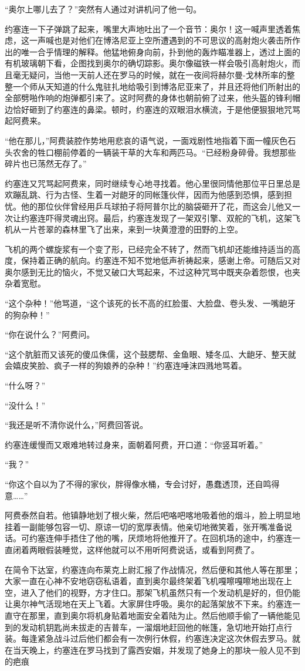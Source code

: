     “奥尔上哪儿去了？”突然有人通过对讲机问了他一句。

    约塞连一下子弹跳了起来，嘴里大声地吐出了一个音节：奥尔！这一喊声里透着焦虑，这一声喊也是对他们在博洛尼亚上空所遭遇到的不可思议的高射炮火袭击所作出的唯一合乎情理的解释。他猛地俯身向前，扑到他的轰炸瞄准器上，透过上面的有机玻璃朝下看，企图找到奥尔的确切踪影。奥尔像磁铁一样会吸引高射炮火，而且毫无疑问，当他一天前人还在罗马的时候，就在一夜间将赫尔曼-戈林所率的整整一个师从天知道的什么鬼驻扎地给吸引到博洛尼亚来了，并且还将他们所射出的全部劈啪作响的炮弹都引来了。这时阿费的身体也朝前俯了过来，他头盔的锋利帽边恰好砸到了约塞连的鼻梁。顿时，约塞连的双眼泪水横流，于是他便狠狠地咒骂起阿费来。

    “他在那儿，”阿费装腔作势地用悲哀的语气说，一面戏剧性地指着下面一幢灰色石头农舍的牲口棚前停着的一辆装干草的大车和两匹马。“已经粉身碎骨。我想那些碎片也已荡然无存了。”

    约塞连又咒骂起阿费来，同时继续专心地寻找着。他心里很同情他那位平日里总是欢蹦乱跳、行为古怪、生着一对龅牙的同帐篷伙伴，因而为他感到恐惧，感到担忧。他的那位伙伴曾经用乒乓球拍子将阿普尔比的脑袋砸开了花，而这会儿他又一次让约塞连吓得灵魂出窍。最后，约塞连发现了一架双引擎、双舵的飞机，这架飞机从一片苍翠的森林里飞了出来，来到一块黄澄澄的田野的上空。

    飞机的两个螺旋浆有一个变了形，已经完全不转了，然而飞机却还能维持适当的高度，保持着正确的航向。约塞连不知不觉地低声祈祷起来，感谢上帝。可随后又对奥尔感到无比的恼火，不觉又破口大骂起来，不过这种咒骂中既夹杂着怨恨，也夹杂着宽慰。

    “这个杂种！”他骂道，“这个该死的长不高的红脸蛋、大脸盘、卷头发、一嘴龅牙的狗杂种！”

    “你在说什么？”阿费问。

    “这个肮脏而又该死的傻瓜侏儒，这个鼓腮帮、金鱼眼、矮冬瓜、大龅牙、整天就会嬉皮笑脸、疯子一样的狗娘养的杂种！”约塞连唾沫四溅地骂着。

    “什么呀？”

    “没什么！”

    “我还是听不清你说什么，”阿费回答说。

    约塞连缓慢而又艰难地转过身来，面朝着阿费，开口道：“你竖耳听着。”

    “我？”

    “你这个自以为了不得的家伙，胖得像水桶，专会讨好，愚蠢透顶，还自鸣得意……”

    阿费泰然自若。他镇静地划了根火柴，然后吧咯吧喀地吸着他的烟斗，脸上明显地挂着一副能够包容一切、原谅一切的宽厚表情。他亲切地微笑着，张开嘴准备说话。可约塞连伸手捂住了他的嘴，厌烦地将他推开了。在回机场的途中，约塞连一直闭着两眼假装睡觉，这样他就可以不用听阿费说话，或看到阿费了。

    在简令下达室，约塞连向布莱克上尉汇报了作战情况，然后便和其他人等在那里；大家一直在心神不安地窃窃私语着，直到奥尔最终架着飞机嘎嚓嘎嚓地出现在上空，进入了他们的视野，方才住口。那架飞机虽然只有一个发动机是好的，但仍能让奥尔神气活现地在天上飞着。大家屏住呼吸。奥尔的起落架放不下来。约塞连一直守在那里，直到奥尔将机身贴着地面安全着陆为止。然后他顺手偷了一辆他能见到的发动机钥匙尚未拔走的吉普车，一溜烟地赶回他的帐篷，急切地开始打点行装。每逢紧急战斗过后他们都会有一次例行休假，约塞连决定这次休假去罗马。就在当天晚上，约塞连在罗马找到了露西安姻，并发现了她身上的那块一般人见不到的疤痕
